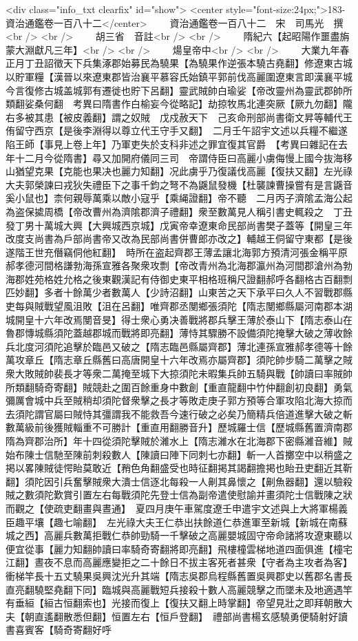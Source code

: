 <div class="info_txt clearfix" id="show">
<center style="font-size:24px;">183-資治通鑑卷一百八十二</center>
  　　資治通鑑卷一百八十二　宋　司馬光　撰<br />
<br />
　　胡三省　音註<br />
<br />
　　隋紀六【起昭陽作噩盡旃蒙大淵獻凡三年】<br />
<br />
　　煬皇帝中<br />
<br />
　　大業九年春正月丁丑詔徵天下兵集涿郡始募民為驍果【為驍果作逆張本驍古堯翻】修遼東古城以貯軍糧【漢晉以來遼東郡皆治襄平慕容氏始鎮平郭前伐高麗圍遼東言即漢襄平城今言復修古城盖城郭有遷徙也貯下呂翻】靈武賊帥白瑜娑【帝改靈州為靈武郡帥所類翻娑桑何翻　考異曰隋書作白榆妄今從略記】劫掠牧馬北連突厥【厥九勿翻】隴右多被其患【被皮義翻】謂之奴賊　戊戍赦天下　己亥命刑部尚書衛文昇等輔代王侑留守西京【是後李淵得以尊立代王守手又翻】　二月壬午詔宇文述以兵糧不繼遂陷王師【事見上卷上年】乃軍吏失於支科非述之罪宜復其官爵　【考異曰雜記在去年十二月今從隋書】尋又加開府儀同三司　帝謂侍臣曰高麗小虜侮慢上國今抜海移山猶望克果【克能也果决也麗力知翻】况此虜乎乃復議伐高麗【復扶又翻】左光祿大夫郭榮諫曰戎狄失禮臣下之事千鈞之弩不為鼷鼠發機【杜襲諫曹操嘗有是言鼷音奚小鼠也】柰何親辱萬乘以敵小寇乎【乘䋲證翻】帝不聽　二月丙子濟隂孟海公起為盗保㨿周橋【帝改曹州為濟隂郡濟子禮翻】衆至數萬見人稱引書史輒殺之　丁丑發丁男十萬城大興【大興城西京城】戊寅帝幸遼東命民部尚書樊子蓋等【開皇三年改度支尚書為戶部尚書帝又改為民部尚書併曹郎亦改之】輔越王侗留守東都【是後遂階王世充僭竊侗他紅翻】　時所在盗起齊郡王薄孟讓北海郭方預清河張金稱平原郝孝德河間格謙勃海孫宣雅各聚衆攻剽【帝改青州為北海郡瀛州為河間郡滄州為勃海郡姓苑格姓允格之後東觀漢記有侍御史東平相格班稱尺證翻郝呼各翻格古百翻剽匹妙翻】多者十餘萬少者數萬人【少詩沼翻】山東苦之天下承平曰久人不習戰郡縣吏每與賊戰望風沮敗【沮在呂翻】唯齊郡丞閺鄉張須陀【隋志閺鄉縣屬河南郡本湖城開皇十六年改焉閺音旻】得士衆心勇决善戰將郡兵擊王薄於泰山下【隋志泰山在魯郡慱城縣須陀蓋越郡城而戰將即亮翻】薄恃其驟勝不設備須陀掩擊大破之薄收餘兵北度河須陀追擊於臨邑又破之【隋志臨邑縣屬齊郡】薄北連孫宣雅郝孝德等十餘萬攻章丘【隋志章丘縣舊曰高唐開皇十六年改焉亦屬齊郡】須陀帥步騎二萬擊之賊衆大敗賊帥裴長才等衆二萬掩至城下大掠須陀未暇集兵帥五騎與戰【帥讀曰率賊帥所類翻騎奇寄翻】賊競赴之圍百餘重身中數創【重直龍翻中竹仲翻創初良翻】勇氣彌厲會城中兵至賊稍却須陀督衆擊之長才等敗走庚子郭方預等合軍攻陷北海大掠而去須陀謂官屬曰賊恃其彊謂我不能救吾今速行破之必矣乃簡精兵倍道進擊大破之斬數萬級前後獲賊輜重不可勝計【重直用翻勝音升】歷城羅士信【歷城縣舊置濟南郡隋為齊郡治所】年十四從須陀擊賊於濰水上【隋志濰水在北海郡下密縣濰音維】賊始布陳士信馳至陳前刺殺數人【陳讀曰陣下同刺七亦翻】斬一人首擲空中以稍盛之掲以畧陳賊徒愕眙莫敢近【矟色角翻盛受也時征翻掲其謁翻擔掲也眙丑吏翻近其靳翻】須陀因引兵奮擊賊衆大潰士信逐北每殺一人劓其鼻懷之【劓魚器翻】還以驗殺賊之數須陀歎賞引置左右每戰須陀先登士信為副帝遣使慰諭并畫須陀士信戰陳之狀而觀之【使疏吏翻畫與晝通】　夏四月庚午車駕度遼壬申遣宇文述與上大將軍楊義臣趣平壤【趣七喻翻】　左光祿大夫王仁恭出扶餘道仁恭進軍至新城【新城在南蘇城之西】高麗兵數萬拒戰仁恭帥勁騎一千擊破之高麗嬰城固守帝命諸將攻遼東聽以便宜從事【麗力知翻帥讀曰率騎奇寄翻將即亮翻】飛樓橦雲梯地道四面俱進【橦宅江翻】晝夜不息而高麗應變拒之二十餘日不拔主客死者甚衆【守者為主攻者為客】衝梯竿長十五丈驍果吳興沈光升其端【隋志吳郡烏程縣舊置吳興郡史以舊郡名書長直亮翻驍堅堯翻下同】臨城與高麗戰短兵接殺十數人高麗競擊之而墜未及地適遇竿有垂絙【絙古恒翻索也】光接而復上【復扶又翻上時掌翻】帝望見壯之即拜朝散大夫【朝直遙翻散悉但翻】恒置左右【恒戶登翻】　禮部尚書楊玄感驍勇便騎射好讀書喜賓客【騎奇寄翻好呼